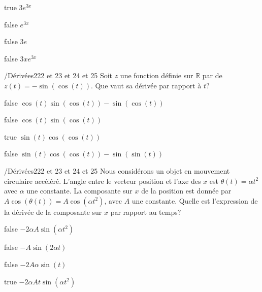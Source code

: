 \documentclass[11pt]{article}
\begin{document}
            \begin{reponses}
            	\item[true] $3e^{3x}$
            	\item[false] $e^{3x}$
                \item[false] $3e$
                \item[false] $3xe^{3x}$
            \end{reponses}

            \begin{question}{/}{Dérivées}{2}{22 et 23 et 24 et 25}
                Soit $z$ une fonction définie sur $\mathbb{R}$ par de $z(t)=-\sin(\cos(t))$. Que vaut sa dérivée par rapport à $t$?
            \end{question}

            \begin{reponses}
                \item[false] $\cos(t)\sin(\cos(t))-\sin(\cos(t))$
                \item[false] $\cos(t)\sin(\cos(t))$
                \item[true] $\sin(t)\cos(\cos(t))$
                \item[false] $\sin(t)\cos(\cos(t))-\sin(\sin(t))$
            \end{reponses}

            \begin{question}{/}{Dérivées}{2}{22 et 23 et 24 et 25}
                Nous considérons un objet en mouvement circulaire accéléré. L'angle entre le vecteur position et l'axe des $x$ est $\theta(t)=\alpha t^2$ avec $\alpha$ une constante. La composante sur $x$ de la position est donnée par \mbox{$A\cos(\theta(t))=A\cos(\alpha t^2)$}, avec $A$ une constante. Quelle est l'expression de la dérivée de la composante sur $x$ par rapport au temps?
            \end{question}

            \begin{reponses}
                \item[false] $-2\alpha A\sin(\alpha t^2)$
                \item[false] $-A\sin(2\alpha t)$
                \item[false] $-2A\alpha\sin(t)$
                \item[true] $-2\alpha At\sin(\alpha t^2)$
            \end{reponses}
\end{document}
